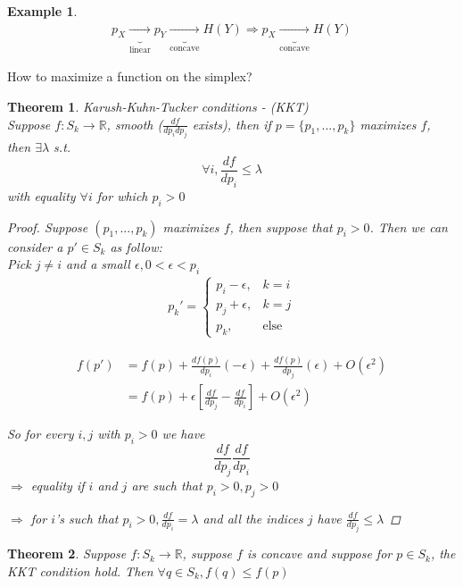 \documentclass{article}
\newtheorem{theorem}{Theorem}[section]
\theoremstyle{definition} %
\newtheorem{example}{Example}
\def\R{\mathbb{R}}
\begin{document}
\begin{appendices}
\begin{example}
  \begin{align*}
    p_X \underbrace{\longrightarrow}_{\text{linear}} p_Y \underbrace{\longrightarrow}_{\text{concave}} H(Y)
    \Longrightarrow p_X \underbrace{\longrightarrow}_{\text{concave}} H(Y)
  \end{align*}
\end{example}

How to maximize a function on the simplex?

\begin{theorem}{Karush-Kuhn-Tucker conditions - (KKT)} \\
  Suppose $f: S_k \rightarrow \R$, smooth ($\frac{df}{dp_i dp_j}$ exists), then if $p = \{ p_1, ..., p_k\}$ maximizes $f$, then $\exists \lambda$ s.t.
  \[ \forall i, \frac{df}{d p_i} \leq \lambda \]
  with equality $\forall i$ for which $p_i > 0$

\begin{proof}
  Suppose $(p_1, ..., p_k)$ maximizes $f$, then suppose that $p_i > 0$. Then we can consider a $p' \in S_k$ as follow:\\
  Pick $j \neq i$ and a small $\epsilon, 0 < \epsilon < p_i$
  \begin{align*}
    p_k' =
    \left\{
    \begin{array}{ll}
      p_i - \epsilon, &k = i \\
      p_j + \epsilon, & k = j \\
      p_k, &\text{else}
    \end{array}
    \right.
  \end{align*}

  \begin{align*}
    f(p') &= f(p) + \frac{d f(p)}{d p_i}(- \epsilon) + \frac{d f(p)}{d p_j} (\epsilon) + O(\epsilon^2) \\
    &= f(p) + \epsilon \left[ \frac{df}{dp_j} - \frac{df}{dp_i} \right] + O(\epsilon^2)
  \end{align*}

  So for every $i, j$ with $p_i > 0$ we have
  \[ \frac{df}{dp_j} \frac{df}{dp_i} \]
  $\Rightarrow$ equality if $i$ and $j$ are such that $p_i > 0, p_j > 0$

  $\Rightarrow$ for $i$'s such that $p_i > 0, \frac{df}{dp_i} = \lambda$ and all the indices $j$ have $\frac{df}{dp_j} \leq \lambda$
\end{proof}

\end{theorem}

\begin{theorem}
  Suppose $f: S_k \rightarrow \R$, suppose $f$ is concave and suppose for $p \in S_k$, the KKT condition hold. Then $\forall q \in S_k, f(q) \leq f(p) $


\end{theorem}
\end{appendices}
\end{document}
